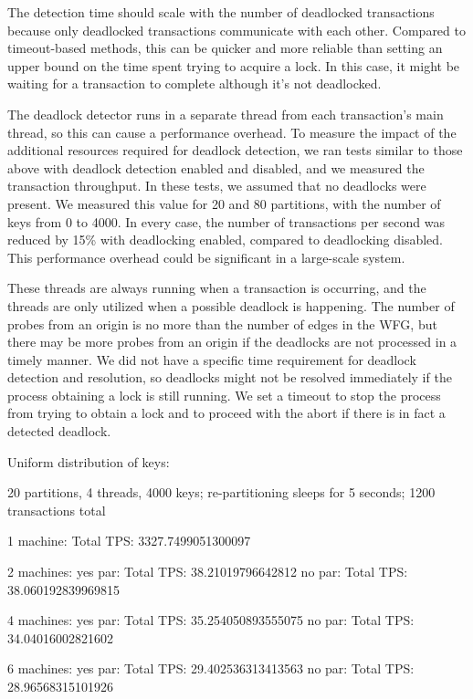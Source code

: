 \documentclass[a4paper, 10pt, notitlepage]{article}
\begin{document}
The detection time should scale with the number of deadlocked transactions because only deadlocked transactions communicate with each other. Compared to timeout-based methods, this can be quicker and more reliable than setting an upper bound on the time spent trying to acquire a lock. In this case, it might be waiting for a transaction to complete although it's not deadlocked.

The deadlock detector runs in a separate thread from each transaction's main thread, so this can cause a performance overhead. To measure the impact of the additional resources required for deadlock detection, we ran tests similar to those above with deadlock detection enabled and disabled, and we measured the transaction throughput. In these tests, we assumed that no deadlocks were present. We measured this value for 20 and 80 partitions, with the number of keys from 0 to 4000. In every case, the number of transactions per second was reduced by 15\% with deadlocking enabled, compared to deadlocking disabled. This performance overhead could be significant in a large-scale system.

These threads are always running when a transaction is occurring, and the threads are only utilized when a possible deadlock is happening. The number of probes from an origin is no more than the number of edges in the WFG, but there may be more probes from an origin if the deadlocks are not processed in a timely manner. We did not have a specific time requirement for deadlock detection and resolution, so deadlocks might not be resolved immediately if the process obtaining a lock is still running. We set a timeout to stop the process from trying to obtain a lock and to proceed with the abort if there is in fact a detected deadlock.


\iffalse
Uniform distribution of keys:

20 partitions, 4 threads, 4000 keys; re-partitioning sleeps for 5 seconds; 1200 transactions total

1 machine:
Total TPS: 3327.7499051300097

2 machines:
yes par: Total TPS: 38.21019796642812
no par: Total TPS: 38.060192839969815

4 machines:
yes par: Total TPS: 35.254050893555075
no par: Total TPS: 34.04016002821602

6 machines:
yes par: Total TPS: 29.402536313413563
no par: Total TPS: 28.96568315101926

\end{document}
